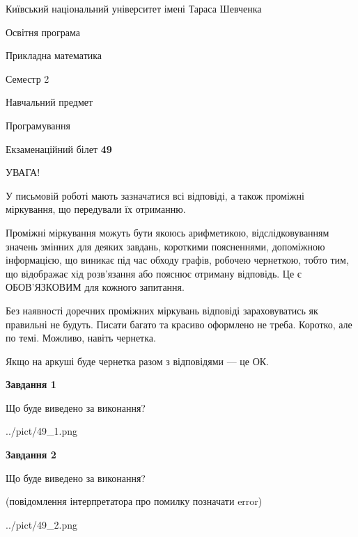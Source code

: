 \documentclass[12pt, ukrainian]{article}
\begin{document}
{{\begin {small}\par
{ \center  Київський національний університет імені Тараса Шевченка \par}
{\parbox {5 cm}{Освітня програма \hfill}{\parbox {7 cm}{Прикладна математика\hfill}}\parbox {6 cm}{\hfill Семестр 2}}\par
{\parbox {5 cm} {Навчальний предмет \hfill}\parbox {7 cm}{Програмування \hfill}\parbox {6cm}{\hfill}\par}\vspace{-7pt} \end{small}}{\center Екзаменаційний білет \No \textbf
{ 49 }\par}}
{
\begin {large}
УВАГА!

У письмовій роботі мають зазначатися всі відповіді, а також проміжні міркування, що передували їх отриманню.

Проміжні міркування можуть бути якоюсь арифметикою, відслідковуванням зна\-чень змінних для деяких завдань,
короткими поясненнями, допоміжною інформацією, що виникає під час обходу графів, робочею чернеткою,
тобто тим, що відображає хід розв’язання або пояснює отриману відповідь.
Це є ОБОВ’ЯЗКОВИМ для кожного запитання.

Без наявності доречних проміжних міркувань відповіді зараховуватись як правиль\-ні не будуть.
Писати багато та красиво оформлено не треба. Коротко, але по темі. Можли\-во, навіть чернетка.

Якщо на аркуші буде чернетка разом з відповідями --- це ОК.

\newpage

{\begin {center}\textbf{Завдання 1}\end {center}}\par
Що буде виведено за виконання?\par
\begin{center}
	{../pict/49_1.png}
\end{center}
\newpage

{\begin {center}\textbf{Завдання 2}\end {center}}\par
Що буде виведено за виконання?\par
 (повідомлення інтерпретатора про помилку позначати error)\par
\begin{center}
	{../pict/49_2.png}
\end{center}
\newpage


\end{large}}
\end{document}
